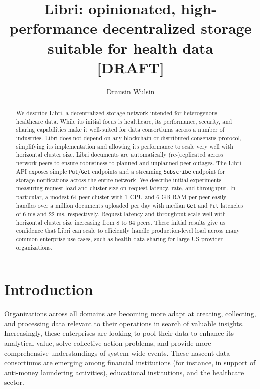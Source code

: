 \documentclass[10pt]{article}
\newcommand{\ttt}[1]{\texttt{#1}}
\def\Put{\ttt{Put}}
\def\Get{\ttt{Get}}
\begin{document}
\title{Libri: opinionated, high-performance decentralized storage suitable for health data \\ \vspace{5mm} \Large [DRAFT]}
\author{Drausin Wulsin}
\maketitle

\begin{abstract}
We describe Libri, a decentralized storage network intended for heterogenous healthcare data. While its initial focus is healthcare, its performance, security, and sharing capabilities make it well-suited for data consortiums across a number of industries. Libri does not depend on any blockchain or distributed consensus protocol, simplifying its implementation and allowing its performance to scale very well with horizontal cluster size. Libri documents are automatically (re-)replicated across network peers to ensure robustness to planned and unplanned peer outages. The Libri API exposes simple \Put{}/\Get{} endpoints and a streaming \ttt{Subscribe} endpoint for storage notifications across the entire network. We describe initial experiments measuring request load and cluster size on request latency, rate, and throughput. In particular, a modest 64-peer cluster with 1 CPU and 6 GB RAM per peer easily handles over a million documents uploaded per day with median \Get{} and \Put{} latencies of 6 ms and 22 ms, respectively. Request latency and throughput scale well with horizontal cluster size increasing from 8 to 64 peers. These initial results give us confidence that Libri can scale to efficiently handle production-level load across many common enterprise use-cases, such as health data sharing for large US provider organizations.
\end{abstract}

\section{Introduction}

Organizations across all domains are becoming more adapt at creating, collecting, and processing data relevant to their operations in search of valuable insights. Increasingly, these enterprises are looking to pool their data to enhance its analytical value, solve collective action problems, and provide more comprehensive understandings of system-wide events. These nascent data consortiums are emerging among financial institutions (for instance, in support of anti-money laundering activities), educational institutions, and the healthcare sector.
\end{document}
